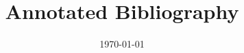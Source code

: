 \documentclass{article}
\title{Annotated Bibliography}
\author{ }
\date{\today}
\begin{document}
\nocite{*}


\end{document}
